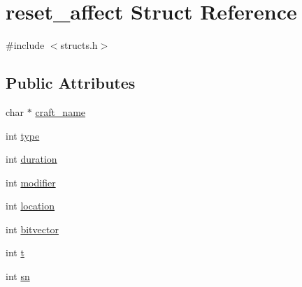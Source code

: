 \hypertarget{structreset__affect}{\section{reset\-\_\-affect Struct Reference}
\label{structreset__affect}
}


{\ttfamily \#include $<$structs.\-h$>$}

\subsection*{Public Attributes}
\begin{DoxyCompactItemize}
\item 
char $\ast$ \hyperlink{structreset__affect_a61c538541fb1ef9ffacfd7731ae08ee7}{craft\-\_\-name}
\item 
int \hyperlink{structreset__affect_a1b74a5ae3578173fe2d55ab808f9207f}{type}
\item 
int \hyperlink{structreset__affect_a01a8e81b7880c8db9328cc462b7d8029}{duration}
\item 
int \hyperlink{structreset__affect_adb8f987e55f7bd4a19a663c6effe7225}{modifier}
\item 
int \hyperlink{structreset__affect_abfd511fc5622a26993ef720fbef8f271}{location}
\item 
int \hyperlink{structreset__affect_a23b9ab03dfb7baa3268278061635e3a4}{bitvector}
\item 
int \hyperlink{structreset__affect_aa283ebf1baee01cf7523732d45248fbe}{t}
\item 
int \hyperlink{structreset__affect_aefffebaff8fd9c83f154b8cda8f85deb}{sn}
\end{DoxyCompactItemize}



